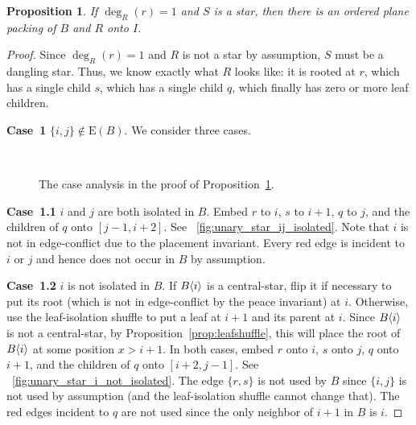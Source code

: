 \documentclass[11pt,a4paper,colorlinks=true,urlcolor=blue,citecolor=red]{article}
\theoremstyle{plain}
\newtheorem{proposition}[theorem]{Proposition}
\newcommand{\case}[1]{\par\vspace{.5\baselineskip}\noindent\textbf{\sffamily Case~#1}}
\newcommand{\EB}{\mathrm{E}(B)}
\begin{document}
\begin{proposition}\label{prop:rec_unary_star}
  If $\deg_R(r)=1$ and $S$ is a star, then there is an ordered plane
  packing of $B$ and $R$ onto $I$.
\end{proposition}
\begin{proof}
  Since $\deg_R(r)=1$ and $R$ is not a star by assumption, $S$ must be a
  dangling star. Thus, we know exactly what $R$ looks like: it is rooted
  at $r$, which has a single child $s$, which has a single child $q$,
  which finally has zero or more leaf children.

  \case{1} $\{i,j\}\not\in\EB$. We consider three cases.

  \begin{figure}[b]
    \centering
    \hfil {}\hfil {}\\
    \hfil {}\hfil {}
    \caption{The case analysis in the proof of
      Proposition~\ref{prop:rec_unary_star}.}
    \label{fig:unary_star}
  \end{figure}

  \case{1.1} $i$ and $j$ are both isolated in $B$. Embed $r$ to $i$, $s$
  to $i+1$, $q$ to $j$, and the children of $q$ onto $[j-1,i+2]$. See
  \figurename~\ref{fig:unary_star_ij_isolated}. Note that $i$ is not in
  edge-conflict due to the placement invariant. Every red edge is
  incident to $i$ or $j$ and hence does not occur in $B$ by assumption.

  \case{1.2} $i$ is not isolated in $B$. If $B\langle{i}\rangle$ is a
  central-star, flip it if necessary to put its root (which is not in
  edge-conflict by the peace invariant) at $i$. Otherwise, use
  the leaf-isolation shuffle to put a leaf at $i+1$ and its parent at
  $i$. Since $B\langle{i}\rangle$ is not a central-star, by
  Proposition~\ref{prop:leafshuffle}, this will place the root of
  $B\langle{i}\rangle$ at some position $x>i+1$. In both cases, embed $r$ onto
  $i$, $s$ onto $j$, $q$ onto $i+1$, and the children of $q$ onto
  $[i+2,j-1]$. See \figurename~\ref{fig:unary_star_i_not_isolated}. The
  edge $\{r,s\}$ is not used by $B$ since $\{i,j\}$ is not used by
  assumption (and the leaf-isolation shuffle cannot change that). The
  red edges incident to $q$ are not used since the only neighbor of
  $i+1$ in $B$ is $i$.


\end{proof}
\end{document}
